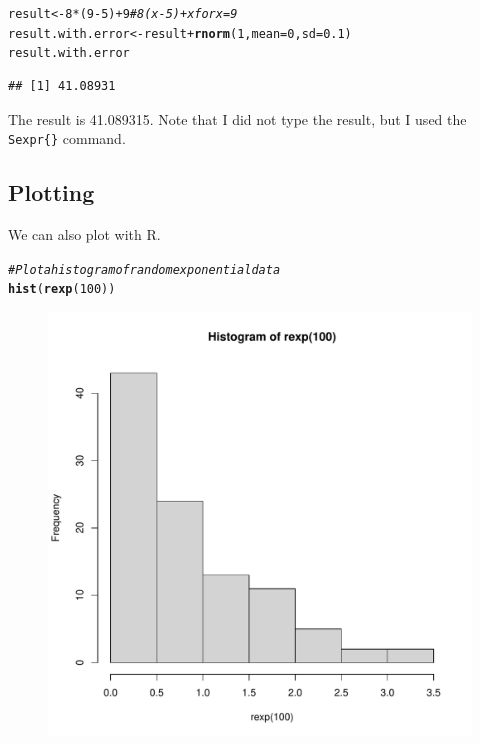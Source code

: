\documentclass{article}\usepackage[]{graphicx}\usepackage[]{xcolor}
\makeatletter
\def\maxwidth{ %
  \ifdim\Gin@nat@width>\linewidth
    \linewidth
  \else
    \Gin@nat@width
  \fi
}
\newcommand{\hlnum}[1]{\textcolor[rgb]{0.686,0.059,0.569}{#1}}%
\newcommand{\hlcom}[1]{\textcolor[rgb]{0.678,0.584,0.686}{\textit{#1}}}%
\newcommand{\hlopt}[1]{\textcolor[rgb]{0,0,0}{#1}}%
\newcommand{\hldef}[1]{\textcolor[rgb]{0.345,0.345,0.345}{#1}}%
\newcommand{\hlkwb}[1]{\textcolor[rgb]{0.69,0.353,0.396}{#1}}%
\newcommand{\hlkwc}[1]{\textcolor[rgb]{0.333,0.667,0.333}{#1}}%
\newcommand{\hlkwd}[1]{\textcolor[rgb]{0.737,0.353,0.396}{\textbf{#1}}}%
\newenvironment{kframe}{%
 \def\at@end@of@kframe{}%
 \ifinner\ifhmode%
  \def\at@end@of@kframe{\end{minipage}}%
  \begin{minipage}{\columnwidth}%
 \fi\fi%
 \def\FrameCommand##1{\hskip\@totalleftmargin \hskip-\fboxsep
 \colorbox{shadecolor}{##1}\hskip-\fboxsep
     \hskip-\linewidth \hskip-\@totalleftmargin \hskip\columnwidth}%
 \MakeFramed {\advance\hsize-\width
   \@totalleftmargin\z@ \linewidth\hsize
   \@setminipage}}%
 {\par\unskip\endMakeFramed%
 \at@end@of@kframe}
\newenvironment{knitrout}{}{} %
\makeatother
\begin{document}
\begin{multicols}{2}
\begin{knitrout}
\color{fgcolor}\begin{kframe}
\begin{alltt}
\hldef{result} \hlkwb{<-} \hlnum{8}\hlopt{*}\hldef{(}\hlnum{9}\hlopt{-}\hlnum{5}\hldef{)} \hlopt{+} \hlnum{9} \hlcom{# 8(x-5) + x for x = 9}
\hldef{result.with.error} \hlkwb{<-} \hldef{result} \hlopt{+} \hlkwd{rnorm}\hldef{(}\hlnum{1}\hldef{,} \hlkwc{mean} \hldef{=} \hlnum{0}\hldef{,} \hlkwc{sd} \hldef{=} \hlnum{0.1}\hldef{)}
\hldef{result.with.error}
\end{alltt}
\begin{verbatim}
## [1] 41.08931
\end{verbatim}
\end{kframe}
\end{knitrout}
The result is 41.089315. Note that I did not type the result, but I used the \verb|Sexpr{}| command.
\subsection{Plotting}
We can also plot with R.
\begin{knitrout}\scriptsize
{}\color{fgcolor}\begin{kframe}
\begin{alltt}
  \hlcom{#Plot a histogram of random exponential data}
  \hlkwd{hist}\hldef{(}\hlkwd{rexp}\hldef{(}\hlnum{100}\hldef{))}
\end{alltt}
\end{kframe}
\end{knitrout}
  
\begin{figure}[H]
\begin{center}
\begin{knitrout}
\color{fgcolor}
\includegraphics[width=\maxwidth]{figure/unnamed-chunk-6-1} 
\end{knitrout}
  

\end{center}
\end{figure}
\end{multicols}
\end{document}
